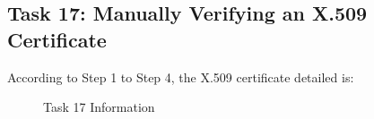 \documentclass[a4paper,11pt]{article}
\begin{document}
\subsection{Task 17: Manually Verifying an X.509 Certificate}
According to Step 1 to Step 4, the X.509 certificate detailed is:
\begin{figure}[h]
    \centering
    \hfill
    \hfill
    \hfill
    \hfill
    \caption{Task 17 Information}\label{fig:task17}
\end{figure}
\end{document}

